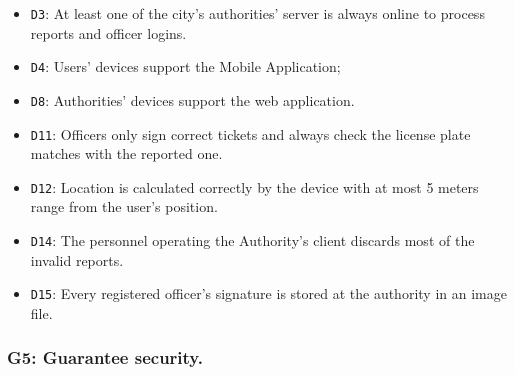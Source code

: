 \documentclass[12pt,a4paper]{article}
\begin{document}
	\begin{itemize}
			\item \texttt{D3}: At least one of the city's authorities' server is always online to process reports and officer logins.
			\item \texttt{D4}: Users' devices support the Mobile Application;
			\item \texttt{D8}: Authorities' devices support the web application.
			\item \texttt{D11}: Officers only sign correct tickets and always check the license plate matches with the reported one.
			\item \texttt{D12}: Location is calculated correctly by the device with at most 5 meters range from the user's position.
			\item \texttt{D14}: The personnel operating the Authority's client discards most of the invalid reports.
			\item \texttt{D15}: Every registered officer's signature is stored at the authority in an image file.
	\end{itemize}

\subsubsection{G5: Guarantee security.}
	
\end{document}
